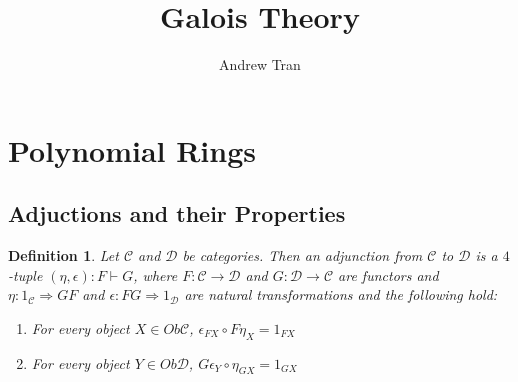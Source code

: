 \documentclass[12pt]{article}
\title{Galois Theory}
\author{Andrew Tran}
\date{}
\newtheorem{defn}{Definition}
\begin{document}
\maketitle

\section{Polynomial Rings}
\subsection{Adjuctions and their Properties}
\begin{defn}
  Let $\mathscr{C}$  and $\mathscr{D}$ be categories. Then an adjunction from $\mathscr{C}$ to $\mathscr{D}$ is a $4$-tuple $(\eta,\epsilon):F\vdash G$,
  where $F:\mathscr{C}\to\mathscr{D}$ and $G:\mathscr{D}\to\mathscr{C}$ are functors and $\eta:1_{\mathscr{C}}\Rightarrow GF$ and 
  $\epsilon:FG\Rightarrow1_{\mathscr{D}}$ are natural transformations and the following hold:
  \begin{enumerate}
    \item For every object $X \in Ob\mathscr{C}$, $\epsilon_{FX}\circ F\eta_{X} = 1_{FX}$ 
    \item For every object $Y \in Ob\mathscr{D}$, $G\epsilon_{Y}\circ\eta_{GX} = 1_{GX}$
  \end{enumerate}
\end{defn}
\end{document}
